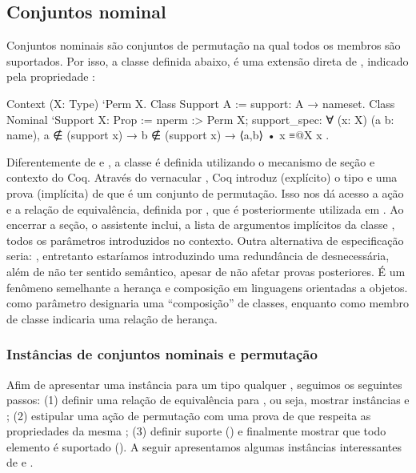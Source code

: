 \subsection{Conjuntos nominal}
Conjuntos nominais são conjuntos de permutação na qual todos os membros são suportados. Por isso, a classe  definida abaixo, é uma extensão direta de , indicado pela propriedade :
\begin{coqcode}
Context (X: Type) `{Perm X}.
Class Support A := support: A → nameset.
Class Nominal `{Support X}: Prop := {
   nperm :> Perm X;
   support_spec: ∀ (x: X) (a b: name),
      a ∉ (support x) → b ∉ (support x) → ⟨a,b⟩ • x ≡@{X} x
}.
\end{coqcode}
Diferentemente de  e , a classe  é definida utilizando o mecanismo de seção e contexto do Coq. Através do vernacular , Coq introduz (explícito) o tipo  e uma prova (implícita) de que é um conjunto de permutação. Isso nos dá acesso a ação e a relação de equivalência, definida por , que é posteriormente utilizada em . Ao encerrar a seção, o assistente inclui, a lista de argumentos implícitos da classe , todos os parâmetros introduzidos no contexto. Outra alternativa de especificação seria: , entretanto estaríamos introduzindo uma redundância de  desnecessária, além de não ter sentido semântico, apesar de não afetar provas posteriores. É um fenômeno semelhante a herança e composição em linguagens orientadas a objetos.  como parâmetro designaria uma ``composição'' de classes, enquanto como membro de classe indicaria uma relação de herança.

\subsubsection{Instâncias de conjuntos nominais e permutação}
Afim de apresentar uma instância  para um tipo qualquer , seguimos os seguintes passos: (1) definir uma relação de equivalência para , ou seja, mostrar instâncias  e ; (2) estipular uma ação de permutação  com uma prova de que respeita as propriedades da mesma ; (3) definir suporte () e finalmente mostrar que todo elemento é suportado (). A seguir apresentamos algumas instâncias interessantes de  e .

